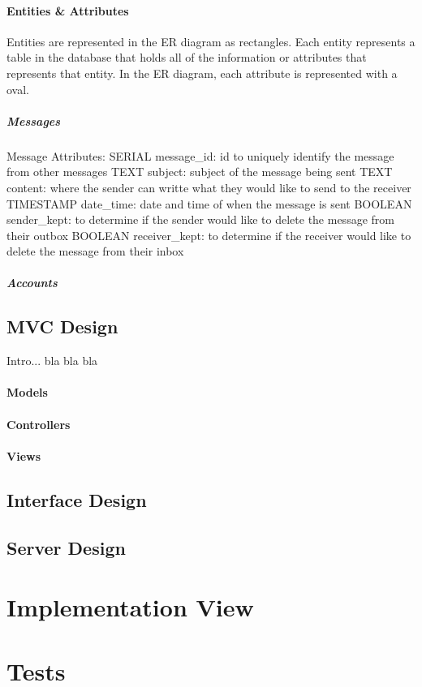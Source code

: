 \documentclass[12pt]{report}
\begin{document}
\paragraph{Entities & Attributes}
Entities are represented in the ER diagram as rectangles.  Each entity represents a table in the database that holds all of the information or attributes that represents that entity.  In the ER diagram, each attribute is represented with a oval.

\subparagraph{Messages}
Message Attributes: 
SERIAL message_id: id to uniquely identify the message from other messages
TEXT subject: subject of the message being sent
TEXT content: where the sender can writte what they would like to send to the receiver
TIMESTAMP date_time: date and time of when the message is sent
BOOLEAN sender_kept: to determine if the sender would like to delete the message from their outbox
BOOLEAN receiver_kept: to determine if the receiver would like to delete the message from their inbox

\subparagraph{Accounts}



\subsection{MVC Design}
Intro... bla bla bla
\paragraph{Models}
\paragraph{Controllers}
\paragraph{Views}

\subsection{Interface Design}
\subsection{Server Design}

\section{Implementation View}

\section{Tests}
\end{document}
